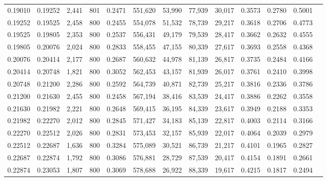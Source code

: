 \begin{tabular}{rrrrrrrrrrrrr}
0.19010 & 0.19252 &  2,441 &   801 &                                     0.2471 & 551,620 &  53,990 &  77,939 &  30,017 & 0.3573 & 0.2780 & 0.5001 \\
0.19252 & 0.19525 &  2,458 &   800 &                                     0.2455 & 554,078 &  51,532 &  78,739 &  29,217 & 0.3618 & 0.2706 & 0.4773 \\
0.19525 & 0.19805 &  2,353 &   800 &                                     0.2537 & 556,431 &  49,179 &  79,539 &  28,417 & 0.3662 & 0.2632 & 0.4555 \\
0.19805 & 0.20076 &  2,024 &   800 &                                     0.2833 & 558,455 &  47,155 &  80,339 &  27,617 & 0.3693 & 0.2558 & 0.4368 \\
0.20076 & 0.20414 &  2,177 &   800 &                                     0.2687 & 560,632 &  44,978 &  81,139 &  26,817 & 0.3735 & 0.2484 & 0.4166 \\
0.20414 & 0.20748 &  1,821 &   800 &                                     0.3052 & 562,453 &  43,157 &  81,939 &  26,017 & 0.3761 & 0.2410 & 0.3998 \\
0.20748 & 0.21200 &  2,286 &   800 &                                     0.2592 & 564,739 &  40,871 &  82,739 &  25,217 & 0.3816 & 0.2336 & 0.3786 \\
0.21200 & 0.21630 &  2,455 &   800 &                                     0.2458 & 567,194 &  38,416 &  83,539 &  24,417 & 0.3886 & 0.2262 & 0.3558 \\
0.21630 & 0.21982 &  2,221 &   800 &                                     0.2648 & 569,415 &  36,195 &  84,339 &  23,617 & 0.3949 & 0.2188 & 0.3353 \\
0.21982 & 0.22270 &  2,012 &   800 &                                     0.2845 & 571,427 &  34,183 &  85,139 &  22,817 & 0.4003 & 0.2114 & 0.3166 \\
0.22270 & 0.22512 &  2,026 &   800 &                                     0.2831 & 573,453 &  32,157 &  85,939 &  22,017 & 0.4064 & 0.2039 & 0.2979 \\
0.22512 & 0.22687 &  1,636 &   800 &                                     0.3284 & 575,089 &  30,521 &  86,739 &  21,217 & 0.4101 & 0.1965 & 0.2827 \\
0.22687 & 0.22874 &  1,792 &   800 &                                     0.3086 & 576,881 &  28,729 &  87,539 &  20,417 & 0.4154 & 0.1891 & 0.2661 \\
0.22874 & 0.23053 &  1,807 &   800 &                                     0.3069 & 578,688 &  26,922 &  88,339 &  19,617 & 0.4215 & 0.1817 & 0.2494 \\

\end{tabular}
